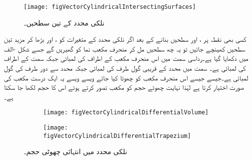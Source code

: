 \begin{figure}
\centering
\texttt{[image: figVectorCylindricalIntersectingSurfaces]}
\caption{نلکی محدد کے تین سطحیں۔}
\label{شکل_سمتیہ_نلکی_تین_سطحیں}
\end{figure}
کسی بھی نقطہ  پر ،  اور  سطحیں  بنانے کے بعد اگر نلکی محدد کے متغیرات کو ،  اور  بڑھا کر مزید تین سطحیں کھینچے جائیں تو یہ چھ سطحیں مل کر منحرف مکعب نما کو گھیریں گے جسے شکل -الف میں دکھایا گیا ہے۔رداسی سمت میں اس منحرف مکعب کے اطراف کی لمبائی  جبکہ   سمت کے اطراف کی لمبائی  ہے۔  سمت میں  محدد کے قریبی  گول طرف کی لمبائی  جبکہ محدد سے دور طرف کی گول لمبائی  ہے۔جیسے جیسے اس منحرف مکعب کو چھوٹا کیا جائے ویسے ویسے یہ ایک درست مکعب کی صورت اختیار کرتا ہے لہٰذا نہایت چھوٹے حجم کو مکعب تصور کرتے ہوئے اس کا حجم  لکھا جا سکتا ہے۔
\begin{figure}
\centering
\begin{subfigure}{0.5\textwidth}
\centering
\texttt{[image: figVectorCylindricalDifferentialVolume]}
\end{subfigure}%
%
\begin{subfigure}{0.5\textwidth}
\centering
\texttt{[image: figVectorCylindricalDifferentialTrapezium]}
\end{subfigure}%
\caption{نلکی محدد میں انتہائی چھوٹی حجم۔}
\label{شکل_سمتیہ_نلکی_چھوٹی_حجم}
\end{figure}  

